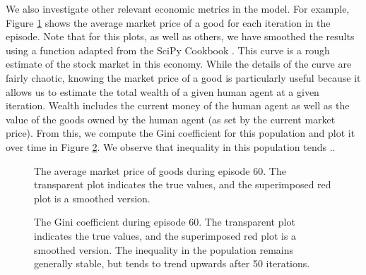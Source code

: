 \documentclass[twoside,twocolumn]{article}
\begin{document}
\medskip
We also investigate other relevant economic metrics in the model. For example, Figure \ref{plt:late-stockmarket} shows the average market price of a good for each iteration in the episode. Note that for this plots, as well as others, we have smoothed the results using a function adapted from the SciPy Cookbook \cite{scipy}. This curve is a rough estimate of the stock market in this economy. While the details of the curve are fairly chaotic, knowing the market price of a good is particularly useful because it allows us to estimate the total wealth of a given human agent at a given iteration. Wealth includes the current money of the human agent as well as the value of the goods owned by the human agent (as set by the current market price). From this, we compute the Gini coefficient for this population and plot it over time in Figure \ref{plt:late-gini}. We observe that inequality in this population tends ..

\begin{figure}[h]
  \caption{The average market price of goods during episode 60. The transparent plot indicates the true values, and the superimposed red plot is a smoothed version.}
  \label{plt:late-stockmarket}
\end{figure}


\begin{figure}[h]
  \caption{The Gini coefficient during episode 60. The transparent plot indicates the true values, and the superimposed red plot is a smoothed version. The inequality in the population remains generally stable, but tends to trend upwards after 50 iterations.}
  \label{plt:late-gini}
\end{figure}
\end{document}
